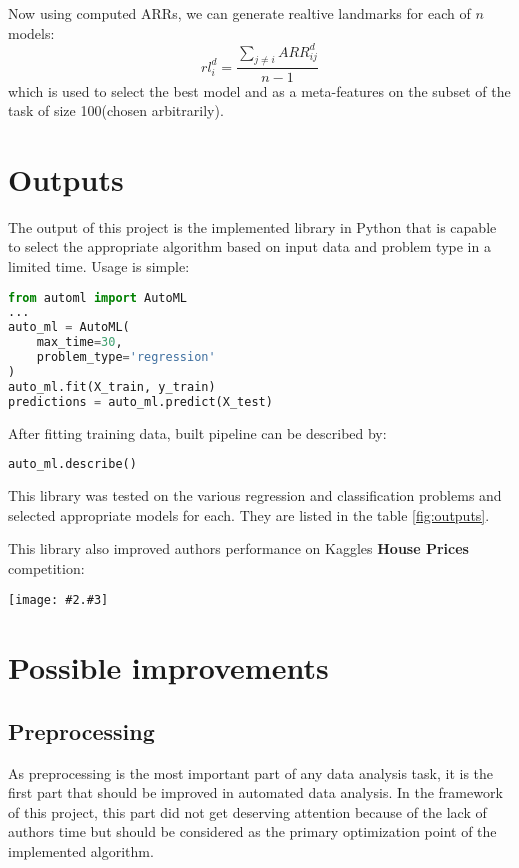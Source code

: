 \documentclass[hidelinks, english]{mvi-report}
\newcommand{\smplimage}[3][1]{
\centerline{
    \texttt{[image: \#2.\#3]}
}
}
\begin{document}
Now using computed ARRs, we can generate realtive landmarks for each of $n$ models:
$$ rl^d_i = \dfrac{\sum_{j \neq i}ARR^d_{ij}}{n - 1} $$
which is used to select the best model and as a meta-features on the subset of the task of size 100(chosen arbitrarily).


\section{Outputs}
The output of this project is the implemented library in Python that is capable to select the appropriate algorithm
based on input data and problem type in a limited time. Usage is simple:

\vspace{0.5cm}
\begin{lstlisting}[language=Python]
from automl import AutoML
...
auto_ml = AutoML(
    max_time=30,
    problem_type='regression'
)
auto_ml.fit(X_train, y_train)
predictions = auto_ml.predict(X_test)

\end{lstlisting}
\vspace{0.5cm}

After fitting training data, built pipeline can be described by:
\vspace{0.5cm}
\begin{lstlisting}[language=Python]
auto_ml.describe()
\end{lstlisting}
\vspace{0.5cm}


This library was tested on the various regression and
classification problems and selected appropriate models for each. They are listed in the table  \ref{fig:outputs}.

This library also improved authors performance on Kaggles \textbf{House Prices} competition:

\vspace{0.5cm}

\smplimage[0.5]{kaggle}{png}


\section{Possible improvements}

\subsection{Preprocessing}
As preprocessing is the most important part of any data analysis task\cite{ten-quick-tips}, it is the first part that
should be improved in automated data analysis. In the framework of this project, this part did not get deserving attention
because of the lack of authors time but should be considered as the primary optimization point of the implemented
algorithm.
\end{document}
